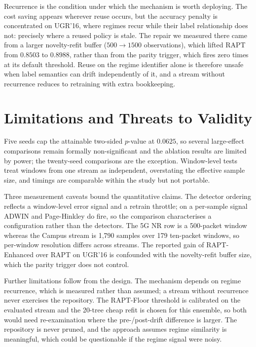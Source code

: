 \documentclass[conference]{IEEEtran}
\begin{document}
Recurrence is the condition under which the mechanism is worth deploying. The cost
saving appears wherever reuse occurs, but the accuracy penalty is concentrated on
UGR'16, where regimes recur while their label relationship does not: precisely where a
reused policy is stale. The repair we measured there came from a larger novelty-refit
buffer ($500 \to 1500$ observations), which lifted RAPT from $0.8503$ to $0.8988$,
rather than from the parity trigger, which fires zero times at its default threshold.
Reuse on the regime identifier alone is therefore unsafe when label semantics can
drift independently of it, and a stream without recurrence reduces to retraining with
extra bookkeeping.

\section{Limitations and Threats to Validity}
\label{sec:limitations}

Five seeds cap the attainable two-sided $p$-value at $0.0625$, so several large-effect
comparisons remain formally non-significant and the ablation results are limited by
power; the twenty-seed comparisons are the exception. Window-level tests treat windows
from one stream as independent, overstating the effective sample size, and timings are
comparable within the study but not portable.

Three measurement caveats bound the quantitative claims. The detector ordering
reflects a window-level error signal and a retrain throttle; on a per-sample signal
ADWIN and Page-Hinkley do fire, so the comparison characterises a configuration
rather than the detectors. The 5G NR row is a 500-packet window whereas the Campus
stream is 1{,}790 samples over 179 ten-packet windows, so per-window resolution
differs across streams. The reported gain of RAPT-Enhanced over RAPT on UGR'16 is
confounded with the novelty-refit buffer size, which the parity trigger does not
control.

Further limitations follow from the design. The mechanism depends on regime
recurrence, which is measured rather than assumed; a stream without recurrence never
exercises the repository. The RAPT-Floor threshold is calibrated on the evaluated
stream and the 20-tree cheap refit is chosen for this ensemble, so both would need
re-examination where the pre-/post-drift difference is larger. The repository is never
pruned, and the approach assumes regime similarity is meaningful, which could be
questionable if the regime signal were noisy.
\end{document}
